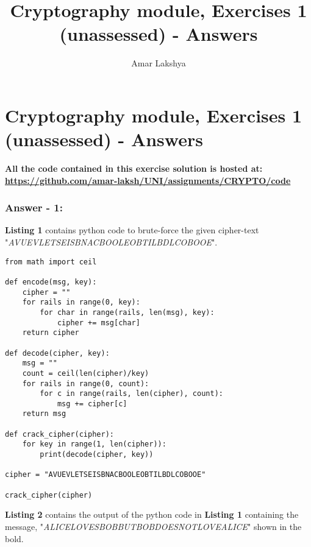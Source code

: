 \documentclass[10pt,a4paper,oneside]{article}
\author{Amar Lakshya}
\title{Cryptography module, Exercises 1 (unassessed) - Answers}
\begin{document}
\part*{Cryptography module, Exercises 1 (unassessed) - Answers}

\textbf{All the code contained in this exercise solution is hosted at:\linebreak
\href{https://github.com/amar-laksh/UNI/tree/master/assignments/CRYPTO/code}
{https://github.com/amar-laksh/UNI/assignments/CRYPTO/code}}
\section*{Answer - 1:}

\textbf{Listing 1} contains python code to brute-force the given cipher-text "\textit{AVUEVLETSEISBNACBOOLEOBTILBDLCOBOOE}".

\begin{lstlisting}
from math import ceil

def encode(msg, key):
    cipher = ""
    for rails in range(0, key):
        for char in range(rails, len(msg), key):
            cipher += msg[char]
    return cipher

def decode(cipher, key):
    msg = ""
    count = ceil(len(cipher)/key)
    for rails in range(0, count):
        for c in range(rails, len(cipher), count):
            msg += cipher[c]
    return msg

def crack_cipher(cipher):
    for key in range(1, len(cipher)):
        print(decode(cipher, key))

cipher = "AVUEVLETSEISBNACBOOLEOBTILBDLCOBOOE"

crack_cipher(cipher)
\end{lstlisting}
\textbf{Listing 2} contains the output of the python code in \textbf{Listing 1} containing the message, "\textit{ALICELOVESBOBBUTBOBDOESNOTLOVEALICE}" shown in the bold.
\end{document}
